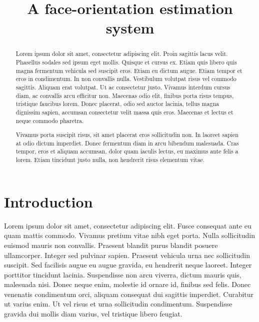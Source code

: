 \documentclass[a4paper]{article}
\title{A face-orientation estimation system}
\begin{document}
\maketitle

%
%

\begin{abstract}

   Lorem ipsum dolor sit amet, consectetur adipiscing elit. Proin sagittis lacus velit. Phasellus sodales sed ipsum eget mollis. Quisque et cursus ex. Etiam quis libero quis magna fermentum vehicula sed suscipit eros. Etiam eu dictum augue. Etiam tempor et eros in condimentum. In non convallis nulla. Vestibulum volutpat risus vel commodo sagittis. Aliquam erat volutpat. Ut ac consectetur justo. Vivamus interdum cursus diam, ac convallis arcu efficitur non. Maecenas odio elit, finibus porta risus tempus, tristique faucibus lorem. Donec placerat, odio sed auctor lacinia, tellus magna dignissim sapien, accumsan consectetur velit massa quis eros. Maecenas et lectus et neque commodo pharetra.

Vivamus porta suscipit risus, sit amet placerat eros sollicitudin non. In laoreet sapien at odio dictum imperdiet. Donec fermentum diam in arcu bibendum malesuada. Cras tempor, eros et aliquam accumsan, dolor quam iaculis lectus, eu maximus ante felis a lorem. Etiam tincidunt justo nulla, non hendrerit risus elementum vitae.

\end{abstract}

\section{Introduction}


Lorem ipsum dolor sit amet, consectetur adipiscing elit. Fusce consequat ante eu quam mattis commodo. Vivamus pretium vitae nibh eget porta. Nulla sollicitudin euismod mauris non convallis. Praesent blandit purus blandit posuere ullamcorper. Integer sed pulvinar sapien. Praesent vehicula urna nec sollicitudin suscipit. Sed facilisis augue eu augue gravida, eu hendrerit neque laoreet. Integer porttitor tincidunt lacinia. Suspendisse non arcu viverra, dictum mauris quis, malesuada nisi. Donec neque enim, molestie id ornare id, finibus sed felis. Donec venenatis condimentum orci, aliquam consequat dui sagittis imperdiet. Curabitur ut varius enim. Ut vel risus et urna sollicitudin condimentum. Suspendisse gravida dui mollis diam varius, vel tristique libero feugiat.
\end{document}
